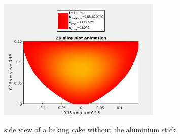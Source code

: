 \begin{figure}[htp]
{        \includegraphics[width=0.69\textwidth]{figures/dirichlet_fullCake_2D181.png}
        }
        \caption{\label{fig::dirichletFull2D} side view of a baking cake without the aluminium stick}
\end{figure}
